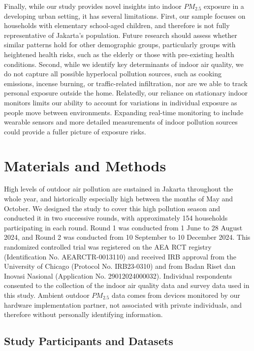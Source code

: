 \documentclass[9pt,twocolumn,twoside]{pnas-new}
\begin{document}
Finally, while our study provides novel insights into indoor $PM_{2.5}$ exposure in a developing urban setting, it has several limitations. First, our sample focuses on  households with elementary school-aged children, and therefore is not fully representative of Jakarta’s population. Future research should assess whether similar patterns hold for other demographic groups, particularly groups with heightened health risks, such as the elderly or those with pre-existing health conditions. Second, while we identify key determinants of indoor air quality, we do not capture all possible hyperlocal pollution sources, such as cooking emissions, incense burning, or traffic-related infiltration, nor are we able to track personal exposure outside the home. Relatedly, our reliance on stationary indoor monitors limits our ability to account for variations in individual exposure as people move between environments. Expanding real-time monitoring to include wearable sensors and more detailed measurements of indoor pollution sources could provide a fuller picture of exposure risks.

\section{Materials and Methods}
High levels of outdoor air pollution are sustained in Jakarta throughout the whole year, and historically especially high between the months of May and October. We designed the study to cover this high pollution season and conducted it in two successive rounds, with approximately 154 households participating in each round. Round 1 was conducted from 1 June to 28 August 2024, and Round 2 was conducted from 10 September to 10 December 2024. This randomized controlled trial was registered on the AEA RCT registry (Identification No. AEARCTR-0013110) and received IRB approval from the University of Chicago (Protocol No. IRB23-0310) and from Badan Riset dan Inovasi Nasional (Application No. 29012024000032).
Individual respondents consented to the collection of the indoor air quality data and survey data used in this study. Ambient outdoor $PM_{2.5}$ data comes from devices monitored by our hardware implementation partner, not associated with private individuals, and therefore without personally identifying information.


\subsection{Study Participants and Datasets}
\label{ssec:mehtods_sampling}
\end{document}
